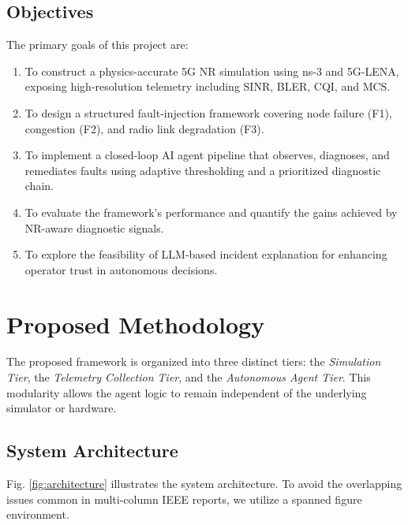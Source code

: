 \documentclass[journal]{IEEEtran}
\begin{document}
\subsection{Objectives}
The primary goals of this project are:
\begin{enumerate}
    \item To construct a physics-accurate 5G NR simulation using ns-3 and 5G-LENA, exposing high-resolution telemetry including SINR, BLER, CQI, and MCS.
    \item To design a structured fault-injection framework covering node failure (F1), congestion (F2), and radio link degradation (F3).
    \item To implement a closed-loop AI agent pipeline that observes, diagnoses, and remediates faults using adaptive thresholding and a prioritized diagnostic chain.
    \item To evaluate the framework's performance and quantify the gains achieved by NR-aware diagnostic signals.
    \item To explore the feasibility of LLM-based incident explanation for enhancing operator trust in autonomous decisions.
\end{enumerate}

\section{Proposed Methodology}

The proposed framework is organized into three distinct tiers: the \textit{Simulation Tier}, the \textit{Telemetry Collection Tier}, and the \textit{Autonomous Agent Tier}. This modularity allows the agent logic to remain independent of the underlying simulator or hardware.

\subsection{System Architecture}
Fig. \ref{fig:architecture} illustrates the system architecture. To avoid the overlapping issues common in multi-column IEEE reports, we utilize a spanned figure environment.
\end{document}
